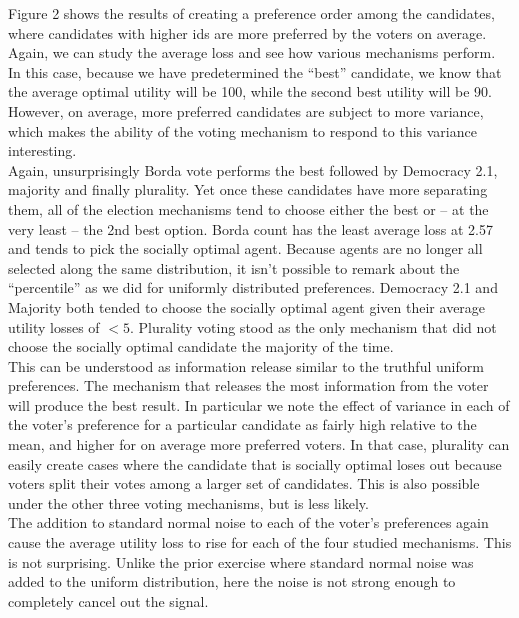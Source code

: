 \documentclass[11pt]{scrartcl}
\begin{document}
Figure 2 shows the results of creating a preference order among the candidates, where candidates with higher ids are more preferred by the voters on average. Again, we can study the average loss and see how various mechanisms perform. In this case, because we have predetermined the ``best'' candidate, we know that the average optimal utility will be 100, while the second best utility will be 90. However, on average, more preferred candidates are subject to more variance, which makes the ability of the voting mechanism to respond to this variance interesting.\\

Again, unsurprisingly Borda vote performs the best followed by Democracy 2.1, majority and finally plurality. Yet once these candidates have more separating them, all of the election mechanisms tend to choose either the best or -- at the very least -- the 2nd best option. Borda count has the least average loss at 2.57 and tends to pick the socially optimal agent. Because agents are no longer all selected along the same distribution, it isn't possible to remark about the ``percentile'' as we did for uniformly distributed preferences. Democracy 2.1 and Majority both tended to choose the socially optimal agent given their average utility losses of $<5$. Plurality voting stood as the only mechanism that did not choose the socially optimal candidate the majority of the time.\\

This can be understood as information release similar to the truthful uniform preferences. The mechanism that releases the most information from the voter will produce the best result. In particular we note the effect of variance in each of the voter's preference for a particular candidate as fairly high relative to the mean, and higher for on average more preferred voters. In that case, plurality can easily create cases where the candidate that is socially optimal loses out because voters split their votes among a larger set of candidates. This is also possible under the other three voting mechanisms, but is less likely.\\

The addition to standard normal noise to each of the voter's preferences again cause the average utility loss to rise for each of the four studied mechanisms. This is not surprising. Unlike the prior exercise where standard normal noise was added to the uniform distribution, here the noise is not strong enough to completely cancel out the signal.\\
\end{document}
